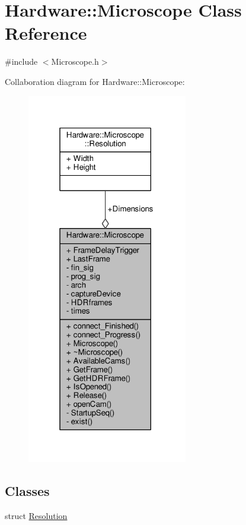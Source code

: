 \hypertarget{class_hardware_1_1_microscope}{}\section{Hardware\+:\+:Microscope Class Reference}
\label{class_hardware_1_1_microscope}


{\ttfamily \#include $<$Microscope.\+h$>$}



Collaboration diagram for Hardware\+:\+:Microscope\+:\nopagebreak
\begin{figure}[H]
\begin{center}
\leavevmode
\includegraphics[width=199pt]{class_hardware_1_1_microscope__coll__graph}
\end{center}
\end{figure}
\subsection*{Classes}
\begin{DoxyCompactItemize}
\item 
struct \hyperlink{struct_hardware_1_1_microscope_1_1_resolution}{Resolution}
\end{DoxyCompactItemize}
